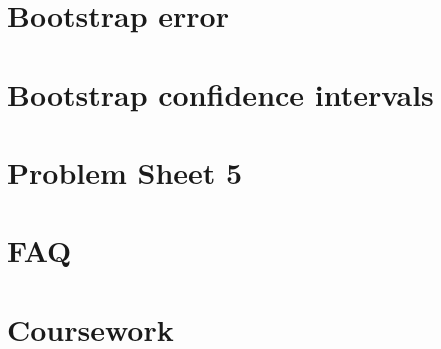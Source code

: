 \documentclass[
  letterpaper,
  DIV=11,
  numbers=noendperiod]{scrreprt}
\theoremstyle{definition}
\theoremstyle{definition}
\theoremstyle{remark}
\begin{document}
\chapter{Bootstrap error}\label{bootstrap-error}

\chapter{Bootstrap confidence
intervals}\label{bootstrap-confidence-intervals}

\chapter*{Problem Sheet 5}\label{problem-sheet-5}



\chapter{FAQ}\label{faq}


\chapter{Coursework}\label{coursework}
\end{document}
